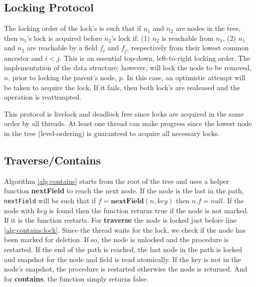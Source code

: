 \documentclass[conference]{IEEEtran}
\theoremstyle{definition}
\theoremstyle{theorem}
\begin{document}
\subsection{Locking Protocol}
The locking order of the lock's is such that if $n_1$ and $n_2$ are nodes in the tree, then $n_1$'s lock is acquired before $n_2$'s lock if: (1) $n_2$ is reachable from $n_1$, (2) $n_1$ and $n_2$ are reachable by a field $f_i$ and $f_j$, respectively from their lowest common ancestor and $i<j$. This is an essential top-down, left-to-right locking order. The implementation of the data structure; however, will lock the node to be removed, $n$, prior to locking the parent's node, $p$. In this case, an optimistic attempt will be taken to acquire the lock. If it fails, then both lock's are realeased and the operation is reattempted.

This protocol is livelock and deadlock free since locks are acquired in the same order by all threads. At least one thread can make progress since the lowest node in the tree (level-ordering) is guaranteed to acquire all necessary locks.

\subsection{Traverse/Contains}
Algorithm \ref{alg:contains} starts from the root of the tree and uses a helper function \textbf{nextField} to reach the next node. If the node is the last in the path, \texttt{nextField} will be such that if $f=\mathbf{nextField}(n, key)$ then $n.f = null$. If the node with $key$ is found then the function returns true if the node is not marked. If it is the function restarts. For \textbf{traverse} the node is locked just before line \ref{alg:contains:lock}. Since the thread waits for the lock, we check if the node has been marked for deletion. If so, the node is unlocked and the procedure is restarted. If the end of the path is reached, the last node in the path is locked and snapshot for the node and field is read atomically. If the key is not in the node's snapshot, the procedure is restarted otherwise the node is returned. And for \textbf{contains}, the function simply returns false.
\end{document}
